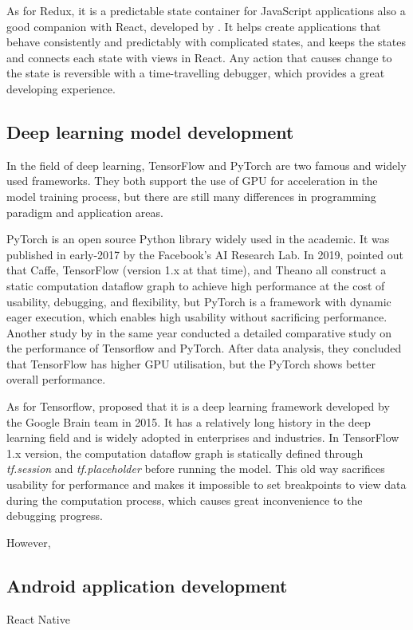 As for Redux, it is a predictable state container for JavaScript applications also a good companion with React, developed by \citet{redux2021}.
It helps create applications that behave consistently and predictably with complicated states, and keeps the states and connects each state with views in React.
Any action that causes change to the state is reversible with a time-travelling debugger, which provides a great developing experience.

\subsection{Deep learning model development} %
In the field of deep learning, TensorFlow and PyTorch are two famous and widely used frameworks.
They both support the use of GPU for acceleration in the model training process, but there are still many differences in programming paradigm and application areas.

PyTorch is an open source Python library widely used in the academic.
It was published in early-2017 by the Facebook's AI Research Lab.
In 2019, \citet{steiner2019pytorch} pointed out that Caffe, TensorFlow (version 1.x at that time), and Theano all construct a static computation dataflow graph to achieve high performance at the cost of usability, debugging, and flexibility, but PyTorch is a framework with dynamic eager execution, which enables high usability without sacrificing performance.
Another study by \citet{florencio2019performance} in the same year conducted a detailed comparative study on the performance of Tensorflow and PyTorch.
After data analysis, they concluded that TensorFlow has higher GPU utilisation, but the PyTorch shows better overall performance.

As for Tensorflow, \citet{abadi2015tensorflow} proposed that it is a deep learning framework developed by the Google Brain team in 2015.
It has a relatively long history in the deep learning field and is widely adopted in enterprises and industries.
In TensorFlow 1.x version, the computation dataflow graph is statically defined through \textit{tf.session} and \textit{tf.placeholder} before running the model.
This old way sacrifices usability for performance and makes it impossible to set breakpoints to view data during the computation process, which causes great inconvenience to the debugging progress.

However, \citet{singh2020introduction}

\citet{luo2020comparison}

\subsection{Android application development} %
\citet{singh2020mobile}

\citet{fadlilah2021development}

React Native \citet{eisenman2015learning}